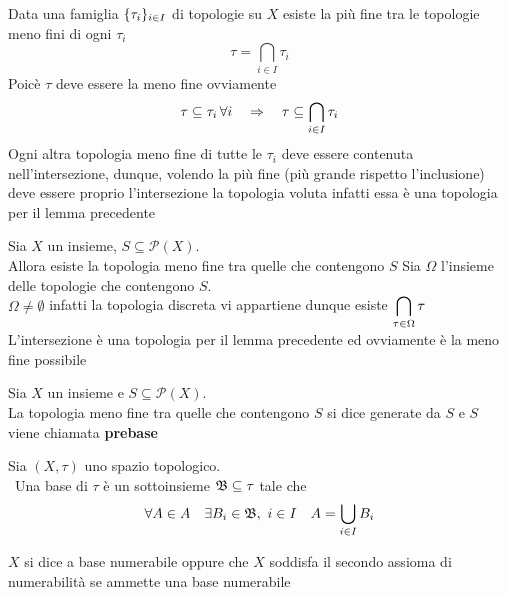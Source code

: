 \begin{cor}Data una famiglia $\displaystyle \{ \tau_i\}_{i \in I } $ di topologie su $X$ esiste la pi\`u fine tra le topologie meno fini di ogni $\tau_i$
$$ \tau=\bigcap_{i \in I } \tau_i $$ 
\proof  Poic\`e $\tau$ deve essere la meno fine ovviamente $$\tau \subseteq \tau_i \, \forall i \quad \Rightarrow \quad \tau\subseteq \bigcap_{i \in I} \tau_i $$ 
Ogni altra topologia meno fine di tutte le $\tau_i$ deve essere contenuta nell'intersezione, dunque, volendo la pi\`u fine (pi\`u grande rispetto l'inclusione) deve essere proprio l'intersezione la topologia voluta infatti essa \`e una topologia per il lemma precedente
\endproof
  \end{cor}
\begin{cor}
 Sia $X$ un insieme, $S \subseteq \mathcal{P}(X)$.\\
 Allora esiste la topologia meno fine tra quelle che contengono $S$
 \proof Sia $\Omega$ l'insieme delle topologie che contengono $S$.\\
 $\Omega \neq \emptyset $ infatti la topologia discreta vi appartiene dunque esiste $\displaystyle \bigcap_{\tau\in \Omega} \tau $\\
 L'intersezione \`e una topologia per il lemma precedente ed ovviamente \`e la meno fine possibile
\end{cor}

\begin{defn}
 Sia $X$ un insieme e $S\subseteq\mathcal{P}(X)$.\\
 La topologia meno fine tra quelle che contengono $S$ si dice generate da $S$ e $S$ viene chiamata \textbf{prebase} 
\end{defn}
\spazio

\begin{defn}\bianco
Sia $(X,\tau)$ uno spazio topologico.\\\
Una base  di $\tau$ \`e un sottoinsieme $\mathfrak{B}\subseteq \tau$  tale che 
$$ \forall A \in A \quad \exists B_i \in \mathfrak{B}, \, \,  i \in I \quad A=\bigcup_{i \in I } B_i $$
\end{defn}
\spazio
\begin{defn}
 $X$ si dice a base numerabile oppure che $X$ soddisfa il secondo assioma di numerabilit\`a se ammette una base numerabile 
\end{defn}
\spazio

